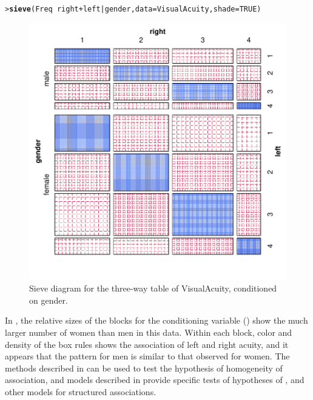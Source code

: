 \documentclass[10pt,krantz2]{krantz}\usepackage[]{graphicx}\usepackage[]{color}
\makeatletter
\newcommand{\hlnum}[1]{\textcolor[rgb]{0.686,0.059,0.569}{#1}}%
\newcommand{\hlopt}[1]{\textcolor[rgb]{0,0,0}{#1}}%
\newcommand{\hlstd}[1]{\textcolor[rgb]{0.345,0.345,0.345}{#1}}%
\newcommand{\hlkwc}[1]{\textcolor[rgb]{0.333,0.667,0.333}{#1}}%
\newcommand{\hlkwd}[1]{\textcolor[rgb]{0.737,0.353,0.396}{\textbf{#1}}}%
\newenvironment{kframe}{%
 \def\at@end@of@kframe{}%
 \ifinner\ifhmode%
  \def\at@end@of@kframe{\end{minipage}}%
  \begin{minipage}{\columnwidth}%
 \fi\fi%
 \def\FrameCommand##1{\hskip\@totalleftmargin \hskip-\fboxsep
 \colorbox{shadecolor}{##1}\hskip-\fboxsep
     \hskip-\linewidth \hskip-\@totalleftmargin \hskip\columnwidth}%
 \MakeFramed {\advance\hsize-\width
   \@totalleftmargin\z@ \linewidth\hsize
   \@setminipage}}%
 {\par\unskip\endMakeFramed%
 \at@end@of@kframe}
\newenvironment{knitrout}{}{} %
\renewenvironment{knitrout}{\small\renewcommand{\baselinestretch}{.85}}{} %
\makeatother
\begin{document}
\begin{knitrout}
\color{fgcolor}\begin{kframe}
\begin{alltt}
\hlstd{> }\hlkwd{sieve}\hlstd{(Freq} \hlopt{~} \hlstd{right} \hlopt{+} \hlstd{left} \hlopt{|} \hlstd{gender,}  \hlkwc{data} \hlstd{= VisualAcuity,} \hlkwc{shade}\hlstd{=}\hlnum{TRUE}\hlstd{)}
\end{alltt}
\end{kframe}\begin{figure}[!htbp]

\centerline{\includegraphics[width=.7\textwidth]{ch04/fig/VA-sieve3-1} }

\caption[Sieve diagram for the three-way table of VisualAcuity, conditioned on gender]{Sieve diagram for the three-way table of VisualAcuity, conditioned on gender.\label{fig:VA-sieve3}}
\end{figure}


\end{knitrout}

In , the relative sizes of the blocks for the conditioning
variable () show the much larger number of women than men in
this data.  Within each block, color and density of the box rules shows the
association of left and right acuity, and it appears that the pattern
for men is similar to that observed for women.
The methods described in  can be used to test
the hypothesis of homogeneity of association, and
\loglin models described in  provide
specific tests of hypotheses of ,
 and other models for structured associations.
\end{document}
